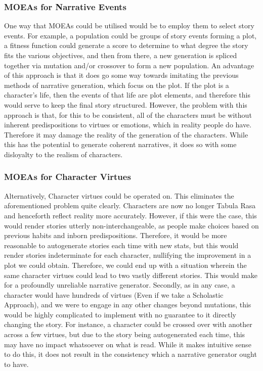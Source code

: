 \documentclass[11pt]{article}
\begin{document}
\subsubsection{MOEAs for Narrative Events}
One way that MOEAs could be utilised would be to employ them to select story events. For example, a population could be groups of story events forming a plot, a fitness function could generate a score to determine to what degree the story fits the various objectives, and then from there, a new generation is spliced together via mutation and/or crossover to form a new population. An advantage of this approach is that it does go some way towards imitating the previous methods of narrative generation, which focus on the plot. If the plot is a character's life, then the events of that life are plot elements, and therefore this would serve to keep the final story structured. However, the problem with this approach is that, for this to be consistent, all of the characters must be without inherent predispositions to virtues or emotions, which in reality people do have. Therefore it may damage the reality of the generation of the characters. While this has the potential to generate coherent narratives, it does so with some disloyalty to the realism of characters.\\
\subsubsection{MOEAs for Character Virtues} 
Alternatively, Character virtues could be operated on. This eliminates the aforementioned problem quite clearly. Characters are now no longer Tabula Rasa and henceforth reflect reality more accurately. However, if this were the case, this would render stories utterly non-interchangeable, as people make choices based on previous habits and inborn predispositions. Therefore, it would be more reasonable to autogenerate stories each time with new stats, but this would render stories indeterminate for each character, nullifying the improvement in a plot we could obtain. Therefore, we could end up with a situation wherein the same character virtues could lead to two vastly different stories. This would make for a profoundly unreliable narrative generator. Secondly, as in any case, a character would have hundreds of virtues (Even if we take a Scholastic Approach), and we were to engage in any other changes beyond mutations, this would be highly complicated to implement with no guarantee to it directly changing the story. For instance, a character could be crossed over with another across a few virtues, but due to the story being autogenerated each time, this may have no impact whatsoever on what is read. While it makes intuitive sense to do this, it does not result in the consistency which a narrative generator ought to have.\\
\end{document}
